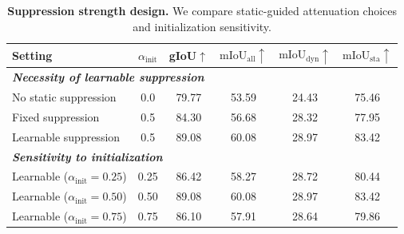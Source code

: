 \begin{table}[!tbp]
\caption{\textbf{Suppression strength design.} We compare static-guided attenuation choices and initialization sensitivity.}
\label{tab:suppression_strength}
\centering
\scriptsize
\setlength{\tabcolsep}{2.3pt}
\renewcommand{\arraystretch}{1.08}
\begin{tabular*}{\columnwidth}{@{\extracolsep{\fill}}lccccc@{}}
\toprule
Setting & $\alpha_{\mathrm{init}}$ & gIoU$\uparrow$ & $\mathrm{mIoU}_{\mathrm{all}}\uparrow$ & $\mathrm{mIoU}_{\mathrm{dyn}}\uparrow$ & $\mathrm{mIoU}_{\mathrm{sta}}\uparrow$ \\
\midrule
\multicolumn{6}{l}{\textbf{\textit{Necessity of learnable suppression}}} \\
No static suppression & 0.0 & 79.77 & 53.59 & 24.43 & 75.46 \\
Fixed suppression & 0.5 & 84.30 & 56.68 & 28.32 & 77.95 \\
Learnable suppression & 0.5 & 89.08 & 60.08 & 28.97 & 83.42 \\
\midrule
\multicolumn{6}{l}{\textbf{\textit{Sensitivity to initialization}}} \\
Learnable ($\alpha_{\mathrm{init}}=0.25$) & 0.25 & 86.42 & 58.27 & 28.72 & 80.44 \\
Learnable ($\alpha_{\mathrm{init}}=0.50$) & 0.50 & 89.08 & 60.08 & 28.97 & 83.42 \\
Learnable ($\alpha_{\mathrm{init}}=0.75$) & 0.75 & 86.10 & 57.91 & 28.64 & 79.86 \\
\bottomrule
\end{tabular*}
\end{table}

